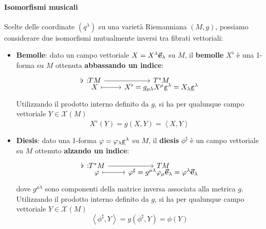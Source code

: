 \paragraph{Isomorfismi musicali}
Scelte delle coordinate $\left(q^\lambda\right)$ su una varietà Riemanniana $(M,g)$, possiamo considerare due isomorfismi mutualmente inversi tra fibrati vettoriali:
\begin{itemize}
	\item \textbf{Bemolle}: dato un campo vettoriale $X=X^\lambda\vb*{\va{e}}_\lambda$ su $M$, il \textbf{bemolle} $X^\flat$ è una 1-forma su $M$ ottenuta \textbf{abbassando un indice}:
	\begin{equation}
		\funztot[\flat]{TM}{T^\ast M}{X}{X^{\flat}=g_{\mu\lambda}X^{\mu}\fb{\epsilon}^\lambda=X_{\lambda}\fb{\epsilon}^\lambda}
	\end{equation}
	Utilizzando il prodotto interno definito da $g$, si ha per qualunque campo vettoriale $Y\in\mathcal{X}(M)$
	\begin{equation*}
		X^\flat(Y)=g(X,Y)=\left<X,Y\right>
	\end{equation*}
\item \textbf{Diesis}: dato una 1-forma $\varphi=\varphi_\lambda\vb*{\underline{\varepsilon}}^\lambda$ su $M$, il \textbf{diesis} $\phi^\sharp$ è un campo vettoriale su $M$ ottenuto \textbf{alzando un indice}:
\begin{equation}
	\funztot[\flat]{T^\ast M}{TM}{\phi}{\phi^{\sharp}=g^{\mu\lambda}\phi_{\mu}\vba{e}_\lambda=\phi^{\lambda}\vba{e}_\lambda}
\end{equation}
dove $g^{\mu\lambda}$ sono componenti della matrice inversa associata alla metrica $g$.\\
Utilizzando il prodotto interno definito da $g$, si ha per qualunque campo vettoriale $Y\in\mathcal{X}(M)$
\begin{equation*}
	\left<\phi^\sharp,Y\right>=g(\phi^\sharp,Y)=\phi(Y)
\end{equation*}
\end{itemize}

